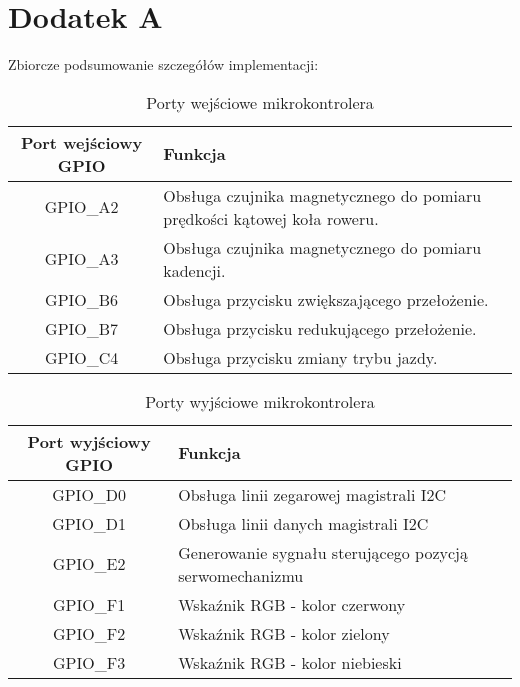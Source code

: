 \chapter*{Dodatek A}

Zbiorcze podsumowanie szczegółów implementacji:
\begin{table}[h]
    \caption{Porty wejściowe mikrokontrolera}
    \begin{center}
		\label{tab:portyGPIO}
		\begin{tabular}{|c|>{\centering}m{6.5cm}|}
 			\hline
 			\textbf{Port wejściowy GPIO} & \textbf{Funkcja} \tabularnewline
 			\hline
 			GPIO\_A2 & Obsługa czujnika magnetycznego do pomiaru prędkości kątowej koła roweru. \tabularnewline
 			\hline
 			GPIO\_A3 &  Obsługa czujnika magnetycznego do pomiaru kadencji. \tabularnewline
 			\hline
 			GPIO\_B6 & Obsługa przycisku zwiększającego przełożenie. \tabularnewline
 			\hline
 			GPIO\_B7 &  Obsługa przycisku redukującego przełożenie.\tabularnewline
 			\hline
 			GPIO\_C4 & Obsługa przycisku zmiany trybu jazdy. \tabularnewline
 			\hline
		\end{tabular}
	\end{center}
\end{table}

\begin{table}[h]
    \caption{Porty wyjściowe mikrokontrolera}
    \begin{center}
		\label{tab:portyGPIO}
		\begin{tabular}{|c|>{\centering}m{6.5cm}|}
 			\hline
 			\textbf{Port wyjściowy GPIO} & \textbf{Funkcja} \tabularnewline
 			\hline
 			GPIO\_D0 & Obsługa linii zegarowej magistrali I2C \tabularnewline
 			\hline
 			GPIO\_D1 & Obsługa linii danych magistrali I2C \tabularnewline
 			\hline
 			GPIO\_E2 & Generowanie sygnału sterującego pozycją serwomechanizmu \tabularnewline
 			\hline
 			GPIO\_F1 & Wskaźnik RGB - kolor czerwony  \tabularnewline
			\hline
 			GPIO\_F2 &  Wskaźnik RGB - kolor zielony\tabularnewline
			\hline
 			GPIO\_F3 &  Wskaźnik RGB - kolor niebieski\tabularnewline
			\hline
		\end{tabular}
	\end{center}
\end{table}

